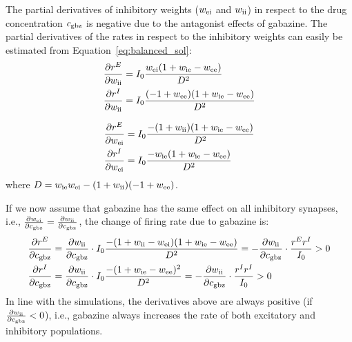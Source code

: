     The partial derivatives of inhibitory weights ($w_{\rm ei}$ and $w_{\rm
    ii}$) in respect to the drug concentration $c_{\rm gbz}$ is negative due to
    the antagonist  effects of gabazine. The partial derivatives of the rates
    in respect to the inhibitory weights can easily be estimated from
    Equation~\ref{eq:balanced_sol}:
    \begin{equation}
      \begin{split}
        \frac{\partial r^E}{\partial w_{\rm ii}} &= 
              I_0 \frac{w_{\rm ei} (1 + w_{\rm ie} - w_{\rm ee})} {D^2} \\
        \frac{\partial r^I}{\partial w_{\rm ii}} &=
              I_0 \frac{(-1 + w_{\rm ee})(1 + w_{\rm ie} - w_{\rm ee})} {D^2} \\
      \end{split}
      \label{eq:drdwii}
    \end{equation}

    \begin{equation}
      \begin{split}
        \frac{\partial r^E}{\partial w_{\rm ei}} &=
              I_0 \frac{-(1 + w_{\rm ii}) (1 + w_{\rm ie} - w_{\rm ee})} {D^2} \\
        \frac{\partial r^I}{\partial w_{\rm ei}} &=
              I_0 \frac{-w_{\rm ie} (1 + w_{\rm ie} - w_{\rm ee})} {D^2} \\
      \end{split}
      \label{eq:drdwei}
    \end{equation}
    where $D=w_{\rm ie}w_{\rm ei} - (1+w_{\rm ii})(-1+w_{\rm ee})$.
    
    If we now assume that gabazine has the same effect on all inhibitory
    synapses, i.e., $\frac{\partial w_{\rm ei}}{\partial c_{\rm gbz}} =
    \frac{\partial w_{\rm ii}}{\partial c_{\rm gbz}}$, the change of firing
    rate due to gabazine is:
    \begin{equation}
      \begin{split}
        \frac{\partial r^E}{\partial c_{\rm gbz}} &=
            \frac{\partial w_{\rm ii}}{\partial c_{\rm gbz}} \cdot
            I_0 \frac{-(1 + w_{\rm ii} - w_{\rm ei}) (1 + w_{\rm ie} - w_{\rm ee})} {D^2} =
            - \frac{\partial w_{\rm ii}}{\partial c_{\rm gbz}} \cdot \frac{r^E r^I}{I_0} > 0 \\
        \frac{\partial r^I}{\partial c_{\rm gbz}} &=
            \frac{\partial w_{\rm ii}}{\partial c_{\rm gbz}} \cdot
            I_0 \frac{- (1 + w_{\rm ie} - w_{\rm ee})^2} {D^2} =
            - \frac{\partial w_{\rm ii}}{\partial c_{\rm gbz}} \cdot \frac{r^I r^I}{I_0} > 0 \\
      \end{split}
    \end{equation}
    In line with the simulations, the derivatives above are always positive (if
    $\frac{\partial w_{\rm ii}}{\partial c_{\rm gbz}} < 0 $), i.e., gabazine
    always increases the rate of both excitatory and inhibitory
    populations. 

